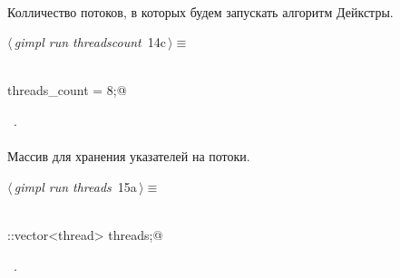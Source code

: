 \documentclass[12pt]{article}
\begin{document}
\paragraph{}
Колличество потоков, в которых будем запускать алгоритм Дейкстры.
\begin{flushleft} \small
\begin{minipage}{\linewidth}\label{scrap27}\raggedright\small
{} $\langle\,${\itshape gimpl run threadscount}\nobreak\ {\footnotesize {14c}}$\,\rangle\equiv$
\vspace{-1ex}
\begin{list}{}{} \item
\mbox{}\verb@@\\
\mbox{}\verb@int threads_count = 8;@\\
\mbox{}\verb@@{\NWsep}
\end{list}
\vspace{-1.5ex}
\footnotesize
\begin{list}{}{\setlength{\itemsep}{-\parsep}\setlength{\itemindent}{-\leftmargin}}
\item \NWtxtMacroRefIn\ .

\item{}
\end{list}
\end{minipage}\vspace{4ex}
\end{flushleft}
\paragraph{}
Массив для хранения указателей на потоки.
\begin{flushleft} \small
\begin{minipage}{\linewidth}\label{scrap28}\raggedright\small
{} $\langle\,${\itshape gimpl run threads}\nobreak\ {\footnotesize {15a}}$\,\rangle\equiv$
\vspace{-1ex}
\begin{list}{}{} \item
\mbox{}\verb@@\\
\mbox{}\verb@std::vector<thread> threads;@\\
\mbox{}\verb@@{\NWsep}
\end{list}
\vspace{-1.5ex}
\footnotesize
\begin{list}{}{\setlength{\itemsep}{-\parsep}\setlength{\itemindent}{-\leftmargin}}
\item \NWtxtMacroRefIn\ .

\item{}
\end{list}
\end{minipage}\vspace{4ex}
\end{flushleft}
\end{document}
